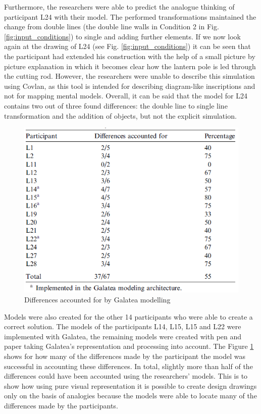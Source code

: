 \documentclass[12pt]{article}
\begin{document}
Furthermore, the researchers were able to predict the analogue thinking of participant L24 with their model. The performed transformations maintained the change from double lines (the double line walls in Condition 2 in Fig. \ref{fig:input_conditions}) to single and adding further elements.  If we now look again at the drawing of L24 (see Fig. \ref{fig:input_conditions}) it can be seen that the participant had extended his construction with the help of a small picture by picture explanation in which it becomes clear how the lantern pole is led through the cutting rod.  However, the researchers were unable to describe this simulation using Covlan, as this tool is intended for describing diagram-like inscriptions and not for mapping mental models. Overall, it can be said that the model for L24 contains two out of three found differences: the double line to single line transformation and the addition of objects, but not the explicit simulation.

\begin{figure}[H]
  \centering
  \includegraphics[width=0.7\linewidth]{images/differences_found.PNG}
  \caption{\label{fig:differences_found}Differences accounted for by Galatea modelling}
\end{figure}  



Models were also created for the other 14 participants who were able to create a correct solution. The models of the participants L14, L15, L15 and L22 were implemented with Galatea, the remaining models were created with pen and paper taking Galatea's representation and processing into account. The Figure \ref{fig:differences_found} shows for how many of the differences made by the participant the model was successful in accounting these differences. In total, slightly more than half of the differences could have been accounted using the researchers' models. This is to show how using pure visual representation it is possible to create design drawings only on the basis of analogies because the models were able to locate many of the differences made by the participants. 
\end{document}
